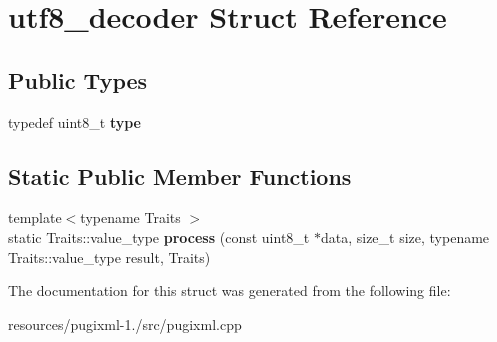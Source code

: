 \hypertarget{structutf8__decoder}{\section{utf8\+\_\+decoder Struct Reference}
\label{structutf8__decoder}
}
\subsection*{Public Types}
\begin{DoxyCompactItemize}
\item 
\hypertarget{structutf8__decoder_a83f88a84f37817f5f4aeb32a3c07b1c2}{typedef uint8\+\_\+t {\bfseries type}}\label{structutf8__decoder_a83f88a84f37817f5f4aeb32a3c07b1c2}

\end{DoxyCompactItemize}
\subsection*{Static Public Member Functions}
\begin{DoxyCompactItemize}
\item 
\hypertarget{structutf8__decoder_a542f1dede169ee2078d2f616ea03c158}{{\footnotesize template$<$typename Traits $>$ }\\static Traits\+::value\+\_\+type {\bfseries process} (const uint8\+\_\+t $\ast$data, size\+\_\+t size, typename Traits\+::value\+\_\+type result, Traits)}\label{structutf8__decoder_a542f1dede169ee2078d2f616ea03c158}

\end{DoxyCompactItemize}


The documentation for this struct was generated from the following file\+:\begin{DoxyCompactItemize}
\item 
resources/pugixml-\/1./src/pugixml.\+cpp\end{DoxyCompactItemize}
